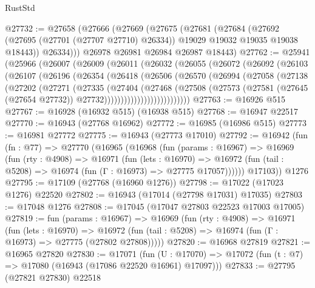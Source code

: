 \begin{lexlean}{RustStd}
\begin{coremodule}
@27732 := @27658
    (@27666
      (@27669
        (@27675
          (@27681
            (@27684
              (@27692 (@27695 (@27701 (@27707 @27710) @26334)) @19029 @19032 @19035 @19038 @18443))
            @26334)))
      @26978
      @26981
      @26984
      @26987
      @18443)
@27762 := @25941
    (@25966
      (@26007
        (@26009
          (@26011
            (@26032
              (@26055
                (@26072
                  (@26092
                    (@26103
                      (@26107
                        (@26196
                          (@26354
                            (@26418
                              (@26506
                                (@26570
                                  (@26994
                                    (@27058
                                      (@27138
                                        (@27202
                                          (@27271
                                            (@27335
                                              (@27404
                                                (@27468
                                                  (@27508
                                                    (@27573
                                                      (@27581
                                                        (@27645 (@27654 @27732))
                                                        @27732))))))))))))))))))))))))))
@27763 := @16926 @515
@27767 := @16928 (@16932 @515) (@16938 @515)
@27768 := @16947 @22517
@27770 := @16943 (@27768 @16962)
@27772 := @16985 (@16986 @515)
@27773 := @16981 @27772
@27775 := @16943 (@27773 @17010)
@27792 := @16942
    (fun (fn : @77) =>
    @27770
      (@16965
        (@16968
          (fun (params : @16967) =>
          @16969
            (fun (rty : @4908) =>
            @16971
              (fun (lets : @16970) =>
              @16972 (fun (tail : @5208) => @16974 (fun (Γ : @16973) => @27775 @17057))))))
        @17103))
    @1276
@27795 := @17109 (@27768 (@16960 @1276))
@27798 := @17022 (@17023 @1276) @22520
@27802 := @16943 (@17014 (@27798 @17031) @17035)
@27803 := @17048 @1276
@27808 := @17045 (@17047 @27803 @22523 @17003 @17005)
@27819 := fun (params : @16967) =>
  @16969
    (fun (rty : @4908) =>
    @16971
      (fun (lets : @16970) =>
      @16972 (fun (tail : @5208) => @16974 (fun (Γ : @16973) => @27775 (@27802 @27808)))))
@27820 := @16968 @27819
@27821 := @16965 @27820
@27830 := @17071
    (fun (U : @17070) => @17072 (fun (t : @7) => @17080 (@16943 (@17086 @22520 @16961) @17097)))
@27833 := @27795 (@27821 @27830) @22518

\end{coremodule}
\end{lexlean}
